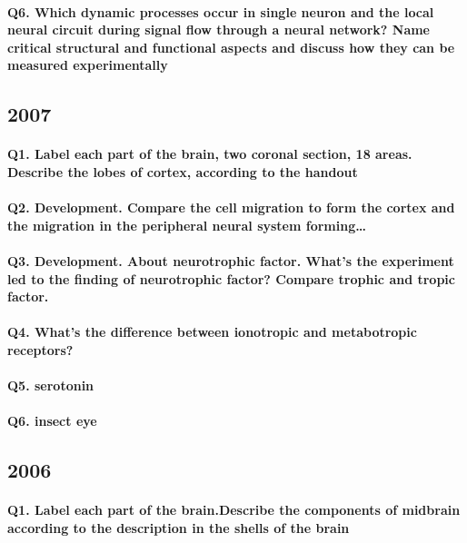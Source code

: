 \documentclass[12pt,article,oneside,a4paper]{memoir}
\begin{document}
\paragraph{Q6. Which dynamic processes occur in single neuron and the local neural circuit during signal flow through a neural network? Name critical structural and functional aspects and discuss how they can be measured experimentally}

\subsection{2007}

\paragraph{Q1. Label each part of the brain, two coronal section, 18 areas. Describe the lobes of cortex, according to the handout}
\paragraph{Q2. Development. Compare the cell migration to form the cortex and the migration in the peripheral neural system forming…}
\paragraph{Q3. Development. About neurotrophic factor. What’s the experiment led to the finding of neurotrophic factor? Compare trophic and tropic factor.}
\paragraph{Q4. What’s the difference between ionotropic and metabotropic receptors?}
\paragraph{Q5. serotonin}
\paragraph{Q6. insect eye}

\subsection{2006}
\paragraph{Q1. Label each part of the brain.Describe the components of midbrain according to the description in the shells of the brain}
\end{document}
